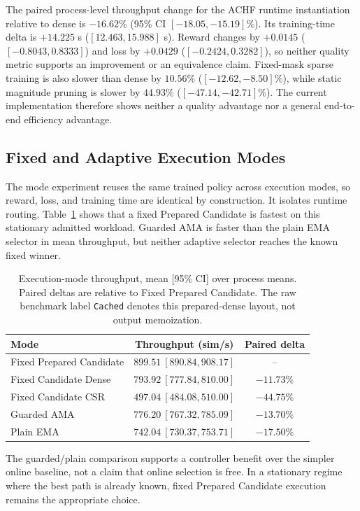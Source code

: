 \documentclass{article}
\newcommand{\ama}{\textsc{AMA}}
\begin{document}
The paired process-level throughput change for the ACHF runtime instantiation
relative to dense is
$-16.62\%$ (95\% CI $[-18.05,-15.19]\%$). Its training-time delta is
$+14.225$ s ($[12.463,15.988]$ s). Reward changes by $+0.0145$
($[-0.8043,0.8333]$) and loss by $+0.0429$ ($[-0.2424,0.3282]$), so neither
quality metric supports an improvement or an equivalence claim. Fixed-mask
sparse training is also slower than dense by $10.56\%$
($[-12.62,-8.50]\%$), while static magnitude pruning is slower by $44.93\%$
($[-47.14,-42.71]\%$). The current implementation therefore shows neither a
quality advantage nor a general end-to-end efficiency advantage.

\subsection{Fixed and Adaptive Execution Modes}

The mode experiment reuses the same trained policy across execution modes, so
reward, loss, and training time are identical by construction. It isolates
runtime routing. Table~\ref{tab:mode-results} shows that a fixed Prepared
Candidate is fastest on this stationary admitted workload. Guarded \ama{} is
faster than the plain EMA selector in mean throughput, but neither adaptive
selector reaches the known fixed winner.

\begin{table}[t]
\centering
\caption{Execution-mode throughput, mean [95\% CI] over process means. Paired
deltas are relative to Fixed Prepared Candidate. The raw benchmark label
\texttt{Cached} denotes this prepared-dense layout, not output memoization.}
\label{tab:mode-results}
\small
\begin{tabular}{lcc}
\toprule
Mode & Throughput (sim/s) & Paired delta \\
\midrule
Fixed Prepared Candidate & $899.51\ [890.84,908.17]$ & -- \\
Fixed Candidate Dense & $793.92\ [777.84,810.00]$ & $-11.73\%$ \\
Fixed Candidate CSR & $497.04\ [484.08,510.00]$ & $-44.75\%$ \\
Guarded \ama{} & $776.20\ [767.32,785.09]$ & $-13.70\%$ \\
Plain EMA & $742.04\ [730.37,753.71]$ & $-17.50\%$ \\
\bottomrule
\end{tabular}
\end{table}

The guarded/plain comparison supports a controller benefit over the simpler
online baseline, not a claim that online selection is free. In a stationary
regime where the best path is already known, fixed Prepared Candidate execution
remains the appropriate choice.
\end{document}
